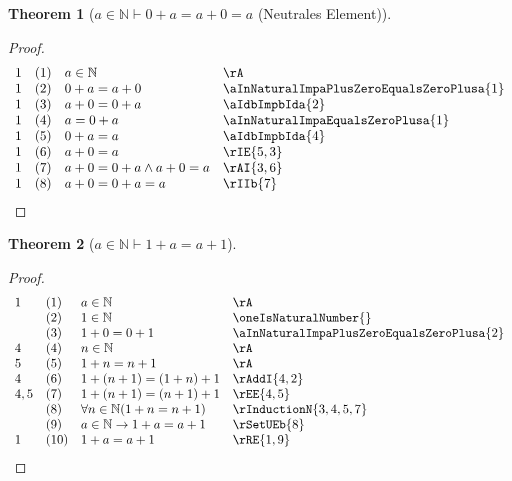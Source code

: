 \documentclass{book}
\theoremstyle{plain}
\newtheorem{theorem}{Theorem}
\theoremstyle{remark}
\theoremstyle{definition}
\begin{document}
\label{aInNaturalImpZeroPlusaEqualsaPlusZeroEqualsa}
\begin{theorem}[\(a\in\mathbb{N}\vdash 0+a=a+0=a\) (Neutrales Element)]
\end{theorem}
\begin{proof}
        \[
	\begin{array}{llll}
            1   &  (1) & a\in\mathbb{N} & \rA \\
            1   &  (2) & 0+a=a+0 & \aInNaturalImpaPlusZeroEqualsZeroPlusa{1} \\
            1   &  (3) & a+0=0+a & \aIdbImpbIda{2} \\
            1   &  (4) & a=0+a & \aInNaturalImpaEqualsZeroPlusa{1} \\
            1   &  (5) & 0+a=a & \aIdbImpbIda{4} \\
            1   &  (6) & a+0=a & \rIE{5,3} \\
            1   &  (7) & a+0=0+a\land a+0=a & \rAI{3,6} \\
            1   &  (8) & a+0=0+a=a & \rIIb{7} \\
	\end{array}
	\]
\end{proof}


\label{aInNaturalImpOnePlusaEqualsaPlusOne}
\begin{theorem}[\(a\in\mathbb{N}\vdash 1+a=a+1\)]
\end{theorem}
\begin{proof}
        \[
	\begin{array}{llll}
            1   &  (1) & a\in\mathbb{N} & \rA \\
                &  (2) & 1\in\mathbb{N} & \oneIsNaturalNumber{} \\
                &  (3) & 1+0=0+1 & \aInNaturalImpaPlusZeroEqualsZeroPlusa{2} \\
            4   &  (4) & n\in\mathbb{N} & \rA \\
            5   &  (5) & 1+n=n+1 & \rA \\
            4   &  (6) & 1+(n+1)=(1+n)+1 & \rAddI{4,2} \\
            4,5 &  (7) & 1+(n+1)=(n+1)+1 & \rEE{4,5} \\
                &  (8) & \forall n\in\mathbb{N}(1+n=n+1) & \rInductionN{3,4,5,7} \\
                &  (9) & a\in\mathbb{N}\rightarrow 1+a=a+1 & \rSetUEb{8} \\
            1   &  (10)&1+a=a+1 & \rRE{1,9} \\
	\end{array}
	\]
\end{proof}
\end{document}
